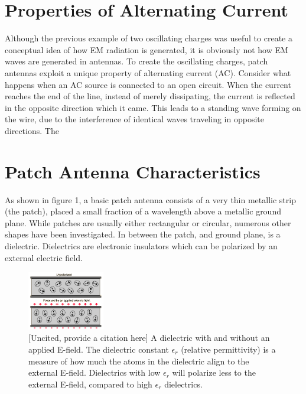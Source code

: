 \documentclass[12pt]{article}
\begin{document}
\section{Properties of Alternating Current}

Although the previous example of two oscillating charges was useful to create a conceptual idea of how EM radiation is generated, it is obviously not how EM waves are generated in antennas. To create the oscillating charges, patch antennas exploit a unique property of alternating current (AC). Consider what happens when an AC source is connected to an open circuit. When the current reaches the end of the line, instead of merely dissipating, the current is reflected in the opposite direction which it came. This leads to a standing wave forming on the wire, due to the interference of identical waves traveling in opposite directions. The 

\section{Patch Antenna Characteristics}

As shown in figure 1, a basic patch antenna consists of a very thin metallic strip (the patch), placed a small fraction of a wavelength above a metallic ground plane. While patches are usually either rectangular or circular\cite{khan2015microstrip}, numerous other shapes have been investigated\cite{balanis2016antenna}. In between the patch, and ground plane, is a dielectric. Dielectrics are electronic insulators which can be polarized by an external electric field. 

\begin{figure}[h]
    \centering
    \includegraphics[width=0.3\textwidth]{dielectric.png}
    \caption{ [Uncited, provide a citation here] A dielectric with and without an applied E-field. The dielectric constant $\epsilon_r$ (relative permittivity) is a measure of how much the atoms in the dielectric align to the external E-field. Dielectrics with low $\epsilon_r$ will polarize less to the external E-field, compared to high $\epsilon_r$ dielectrics.}
\end{figure}
\end{document}
